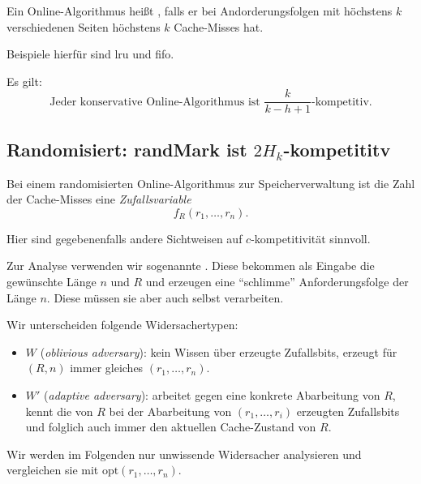 \begin{definition}
  Ein Online-Algorithmus heißt , falls er bei Andorderungsfolgen mit höchstens \( k \) verschiedenen Seiten höchstens \( k \) Cache-Misses hat.

  Beispiele hierfür sind lru und fifo.
\end{definition}

Es gilt:
\begin{equation*}
  \text{Jeder konservative Online-Algorithmus ist } \frac{k}{k-h+1} \text{-kompetitiv.}
\end{equation*}

\subsection{Randomisiert: randMark ist \( 2H_k \)-kompetititv}

Bei einem randomisierten Online-Algorithmus zur Speicherverwaltung ist die Zahl der Cache-Misses eine \emph{Zufallsvariable}
\begin{equation*}
  f_R(r_1,\dots,r_n)\text{.}
\end{equation*}

Hier sind gegebenenfalls andere Sichtweisen auf \( c \)-kompetitivität sinnvoll.

Zur Analyse verwenden wir sogenannte . Diese bekommen als Eingabe die gewünschte Länge \( n \) und \( R \) und erzeugen eine ``schlimme'' Anforderungsfolge der Länge \( n \). Diese müssen sie aber auch selbst verarbeiten.

Wir unterscheiden folgende Widersachertypen:

\begin{itemize}
  \item {} \( W \) (\emph{oblivious adversary}): kein Wissen über erzeugte Zufallsbits, erzeugt für \( (R,n) \) immer gleiches \( (r_1,\dots,r_n) \).
  \item {} \( W' \) (\emph{adaptive adversary}): arbeitet gegen eine konkrete Abarbeitung von \( R \), kennt die von \( R \) bei der Abarbeitung von \( (r_1,\dots,r_i) \) erzeugten Zufallsbits und folglich auch immer den aktuellen Cache-Zustand von \( R \).
\end{itemize}

Wir werden im Folgenden nur unwissende Widersacher analysieren und vergleichen sie mit \( \text{opt}(r_1,\dots,r_n) \).

